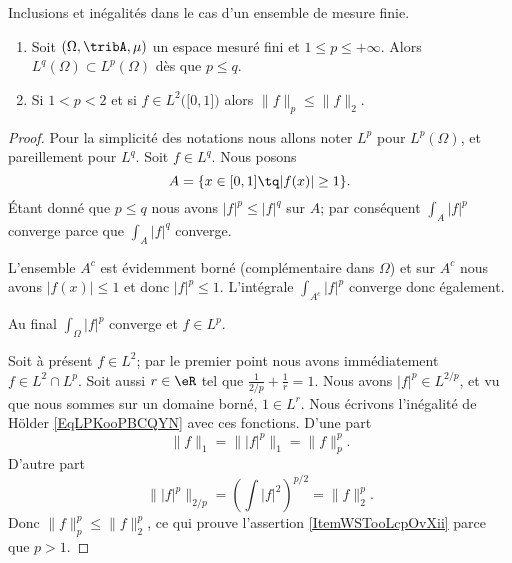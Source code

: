 \begin{proposition} \label{PropIRDooFSWORl}
    Inclusions et inégalités dans le cas d'un ensemble de mesure finie.
    \begin{enumerate}
        \item
            Soit \( (\Omega,\tribA,\mu)\) un espace mesuré fini et \( 1\leq p\leq +\infty\). Alors \( L^q(\Omega)\subset L^p(\Omega)\) dès que \( p\leq q\).
        \item   \label{ItemWSTooLcpOvXii}
            Si \( 1<p<2\) et si \( f\in L^2\big( \mathopen[ 0 , 1 \mathclose] \big)\) alors \( \| f \|_p\leq \| f \|_2\).
    \end{enumerate}
\end{proposition}
\begin{proof}
    Pour la simplicité des notations nous allons noter \( L^p\) pour \( L^p(\Omega)\), et pareillement pour \( L^q\). Soit \( f\in L^q\). Nous posons
    \begin{equation}
        A=\{ x\in\mathopen[ 0 , 1 \mathclose]\tq | f(x) |\geq 1 \}.
    \end{equation}
    Étant donné que \( p\leq q\) nous avons \( | f |^p\leq | f |^q\) sur \( A\); par conséquent \( \int_A| f |^p\) converge parce que \( \int_A| f |^q\) converge.

    L'ensemble \( A^c\) est évidemment borné (complémentaire dans \(  \Omega \)) et sur \( A^c\) nous avons \( | f(x) |\leq 1\) et donc \( | f |^p\leq 1\). L'intégrale \( \int_{A^c}| f |^p\) converge donc également.

    Au final \( \int_{\Omega}| f |^p\) converge et \( f\in L^p\).


    Soit à présent \( f\in L^2\); par le premier point nous avons immédiatement \( f\in L^2\cap L^p\). Soit aussi \( r\in \eR\) tel que \( \frac{1}{ 2/p }+\frac{1}{ r }=1\). Nous avons \( | f |^p\in L^{2/p}\), et vu que nous sommes sur un domaine borné, \( 1\in L^r\). Nous écrivons l'inégalité de Hölder \eqref{EqLPKooPBCQYN} avec ces fonctions. D'une part
    \begin{equation}
        \| f \|_1=\| | f |^p \|_1=\| f \|_p^p.
    \end{equation}
    D'autre part
    \begin{equation}
        \| | f |^p \|_{2/p}=\left( \int| f |^2 \right)^{p/2}=\| f \|_2^p.
    \end{equation}
    Donc \( \| f \|_p^p\leq \| f \|_2^p\), ce qui prouve l'assertion \ref{ItemWSTooLcpOvXii} parce que \( p>1\).
\end{proof}

